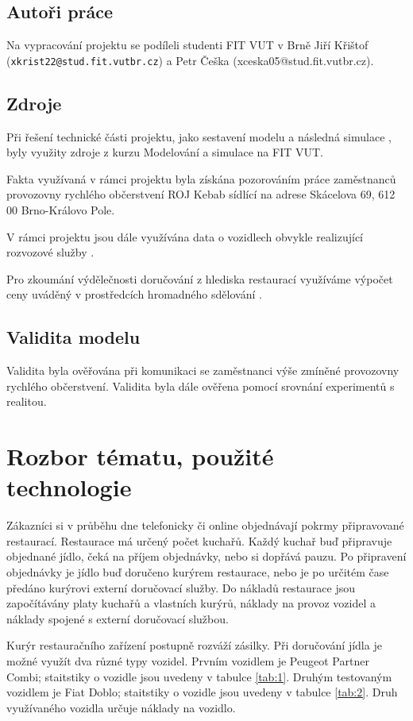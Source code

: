 \documentclass[a4paper, 11pt]{article}
\begin{document}
\subsection{Autoři práce}
Na vypracování projektu se podíleli studenti FIT VUT v Brně Jiří Křištof (\texttt{xkrist22@stud.fit.vutbr.cz}) a Petr Češka (xceska05@stud.fit.vutbr.cz). 

\subsection{Zdroje}
Při řešení technické části projektu, jako sestavení modelu \cite[snímek 7]{IMS_course} a následná simulace \cite[snímek 8]{IMS_course}, byly využity zdroje z kurzu Modelování a simulace na FIT VUT. 

Fakta využívaná v rámci projektu byla získána pozorováním práce zaměstnanců provozovny rychlého občerstvení ROJ Kebab sídlící na adrese Skácelova 69, 612 00 Brno-Královo Pole.

V rámci projektu jsou dále využívána data o vozidlech obvykle realizující rozvozové služby \cite{car_peugeot, car_fiat}.

Pro zkoumání výdělečnosti doručování z hlediska restaurací využíváme výpočet ceny uváděný v prostředcích hromadného sdělování \cite{news}.

\subsection{Validita modelu}
Validita \cite[snímek 37]{IMS_course} byla ověřována při komunikaci se zaměstnanci výše zmíněné provozovny rychlého občerstvení. Validita byla dále ověřena pomocí srovnání experimentů \cite[snímek 9]{IMS_course} s realitou.

\section{Rozbor tématu, použité technologie}
Zákazníci si v průběhu dne telefonicky či online objednávají pokrmy připravované restaurací. Restaurace má určený počet kuchařů. Každý kuchař buď připravuje objednané jídlo, čeká na příjem objednávky, nebo si dopřává pauzu. Po připravení objednávky je jídlo buď doručeno kurýrem restaurace, nebo je po určitém čase předáno kurýrovi externí doručovací služby. Do nákladů restaurace jsou započítávány platy kuchařů a vlastních kurýrů, náklady na provoz vozidel a náklady spojené s externí doručovací službou.

Kurýr restauračního zařízení postupně rozváží zásilky. Při doručování jídla je možné využít dva různé typy vozidel. Prvním vozidlem je Peugeot Partner Combi; staitstiky o vozidle jsou uvedeny v tabulce \ref{tab:1}. Druhým testovaným vozidlem je Fiat Doblo; staitstiky o vozidle jsou uvedeny v tabulce \ref{tab:2}. Druh využívaného vozidla určuje náklady na vozidlo.
\end{document}
